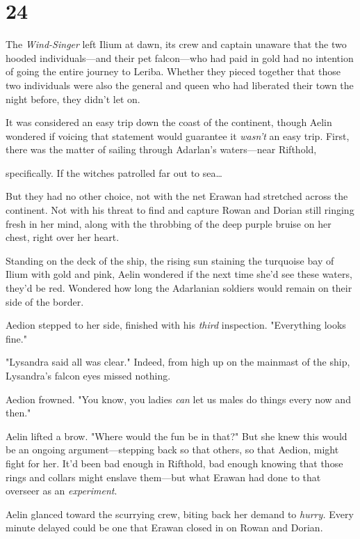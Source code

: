 
\chapter{24}

The \emph{Wind-Singer} left Ilium at dawn, its crew and captain unaware that the two hooded individuals---and their pet falcon---who had paid in gold had no intention of going the entire journey to Leriba. Whether they pieced together that those two individuals were also the general and queen who had liberated their town the night before, they didn't let on.

It was considered an easy trip down the coast of the continent, though Aelin wondered if voicing that statement would guarantee it
\emph{wasn't} an easy trip. First, there was the matter of sailing through Adarlan's waters---near Rifthold,

specifically. If the witches patrolled far out to sea\ldots{}

But they had no other choice, not with the net Erawan had stretched across the continent. Not with his threat to find and capture Rowan and Dorian still ringing fresh in her mind, along with the throbbing of the deep purple bruise on her chest, right over her heart.

Standing on the deck of the ship, the rising sun staining the turquoise bay of Ilium with gold and pink, Aelin wondered if the next time she'd see these waters, they'd be red. Wondered how long the Adarlanian soldiers would remain on their side of the border.

Aedion stepped to her side, finished with his \emph{third} inspection. "Everything looks fine."

"Lysandra said all was clear." Indeed, from high up on the mainmast of the ship, Lysandra's falcon eyes missed nothing.

Aedion frowned. "You know, you ladies \emph{can} let us males do things every now and then."

Aelin lifted a brow. "Where would the fun be in that?" But she knew this would be an ongoing argument---stepping back so that others, so that Aedion, might fight for her. It'd been bad enough in Rifthold, bad enough knowing that those rings and collars might enslave them---but what Erawan had done to that overseer  as an \emph{experiment}.

Aelin glanced toward the scurrying crew, biting back her demand to
\emph{hurry.} Every minute delayed could be one that Erawan closed in on Rowan and Dorian.

